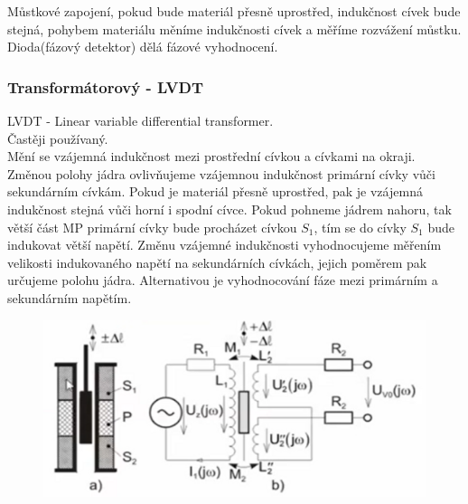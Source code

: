 Můstkové zapojení, pokud bude materiál přesně uprostřed, indukčnost cívek bude stejná, pohybem materiálu měníme indukčnosti cívek a měříme rozvážení můstku. Dioda(fázový detektor) dělá fázové vyhodnocení.\\


\subsubsection*{Transformátorový - LVDT}
LVDT - Linear variable differential transformer.\\
Častěji používaný.\\
Mění se vzájemná indukčnost mezi prostřední cívkou a cívkami na okraji.\\
Změnou polohy jádra ovlivňujeme vzájemnou indukčnost primární cívky vůči sekundárním cívkám. Pokud je materiál přesně uprostřed, pak je vzájemná indukčnost stejná vůči horní i spodní cívce. Pokud pohneme jádrem nahoru, tak větší část MP primární cívky bude procházet cívkou \(S_1\), tím se do cívky \(S_1\) bude indukovat větší napětí. Změnu vzájemné indukčnosti vyhodnocujeme měřením velikosti indukovaného napětí na sekundárních cívkách, jejich poměrem pak určujeme polohu jádra. Alternativou je vyhodnocování fáze mezi primárním a sekundárním napětím.\\

\begin{figure}[h!]
    \centering
    \includegraphics[scale = 0.1]{img/TransOtevInd.png}
\end{figure}

